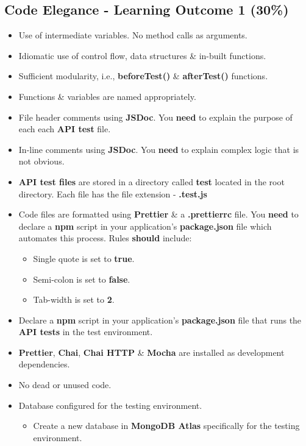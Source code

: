 \documentclass{article}
\begin{document}
\subsection*{Code Elegance - Learning Outcome 1 (30\%)}
\begin{itemize}
    \item Use of intermediate variables. No method calls as arguments.
    \item Idiomatic use of control flow, data structures \& in-built functions.
    \item Sufficient modularity, i.e., \textbf{beforeTest()} \& \textbf{afterTest()} functions.
    \item Functions \& variables are named appropriately.
    \item File header comments using \textbf{JSDoc}. You \textbf{need} to explain the purpose of each each \textbf{API test} file.
    \item In-line comments using \textbf{JSDoc}. You \textbf{need} to explain complex logic that is not obvious.
    \item \textbf{API test files} are stored in a directory called \textbf{test} located in the root directory. Each file has the file extension - \textbf{.test.js}
    \item Code files are formatted using \textbf{Prettier} \& a \textbf{.prettierrc} file. You \textbf{need} to declare a \textbf{npm} script in your application's \textbf{package.json} file which automates this process. Rules \textbf{should} include:
    \begin{itemize}
      \item Single quote is set to \textbf{true}.
      \item Semi-colon is set to \textbf{false}.
      \item Tab-width is set to \textbf{2}.
    \end{itemize}
    \item Declare a \textbf{npm} script in your application's \textbf{package.json} file that runs the \textbf{API tests} in the test environment.
    \item \textbf{Prettier}, \textbf{Chai}, \textbf{Chai HTTP} \& \textbf{Mocha} are installed as development dependencies.
    \item No dead or unused code.
    \item Database configured for the testing environment.
    \begin{itemize}
      \item Create a new database in \textbf{MongoDB Atlas} specifically for the testing environment. 

\end{itemize}
\end{itemize}
\end{document}
